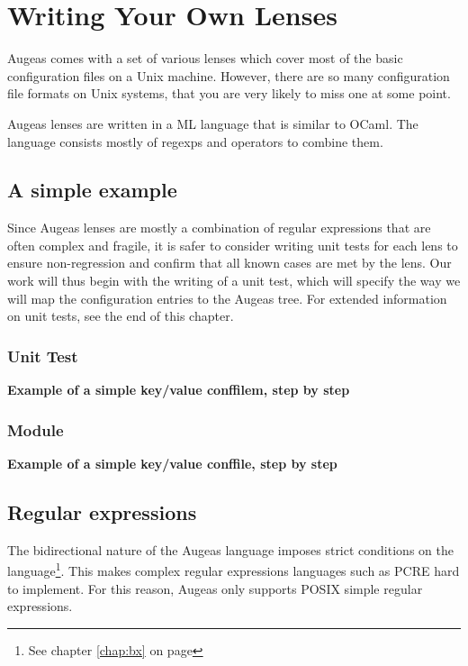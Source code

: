 \chapter{Writing Your Own Lenses}

\label{chap:writing_lenses} 

Augeas comes with a set of various lenses which cover most of the basic configuration files on a Unix machine. However, there are so many configuration file formats on Unix systems, that you are very likely to miss one at some point.

Augeas lenses are written in a ML language that is similar to OCaml. The language consists mostly of regexps and operators to combine them.

\section{A simple example}

Since Augeas lenses are mostly a combination of regular expressions that are often complex and fragile, it is safer to consider writing unit tests for each lens to ensure non-regression and confirm that all known cases are met by the lens. Our work will thus begin with the writing of a unit test, which will specify the way we will map the configuration entries to the Augeas tree. For extended information on unit tests, see the end of this chapter.

\subsection{Unit Test}

\textbf{Example of a simple key/value conffilem, step by step}

\subsection{Module}

\textbf{Example of a simple key/value conffile, step by step}

\section{Regular expressions}

The bidirectional nature of the Augeas language imposes strict conditions on the language\footnote{See chapter \ref{chap:bx} on page \pageref{bx}}. This makes complex regular expressions languages such as PCRE hard to implement. For this reason, Augeas only supports POSIX simple regular expressions.

